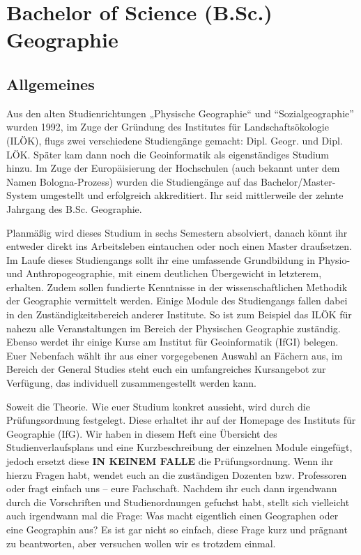 \chapter{Bachelor of Science (B.Sc.) Geographie}

\section{Allgemeines}
Aus den alten Studienrichtungen „Physische Geographie“ und "`Sozialgeographie"' wurden 1992, im Zuge der Gründung des Institutes für Landschaftsökologie (ILÖK), flugs zwei verschiedene Studiengänge gemacht: Dipl. Geogr. und Dipl. LÖK. Später kam dann noch die Geoinformatik als eigenständiges Studium hinzu. Im Zuge der Europäisierung der Hochschulen (auch bekannt unter dem Namen Bologna-Prozess) wurden die Studiengänge auf das Bachelor/Master-System umgestellt und erfolgreich akkreditiert. Ihr seid mittlerweile der zehnte Jahrgang des B.Sc. Geographie.

Planmäßig wird dieses Studium in sechs Semestern absolviert, danach könnt ihr entweder direkt ins Arbeitsleben eintauchen oder noch einen Master draufsetzen. Im Laufe dieses Studiengangs sollt ihr eine umfassende Grundbildung in Physio- und Anthropogeographie, mit einem deutlichen Übergewicht in letzterem, erhalten. Zudem sollen fundierte Kenntnisse in der wissenschaftlichen Methodik der Geographie vermittelt werden. Einige Module des Studiengangs fallen dabei in den Zuständigkeitsbereich anderer Institute. So ist zum Beispiel das ILÖK für nahezu alle Veranstaltungen im Bereich der Physischen Geographie zuständig. Ebenso werdet ihr einige Kurse am Institut für Geoinformatik (IfGI) belegen. Euer Nebenfach wählt ihr aus einer vorgegebenen Auswahl an Fächern aus, im Bereich der General Studies steht euch ein umfangreiches Kursangebot zur Verfügung, das individuell zusammengestellt werden kann.

Soweit die Theorie. Wie euer Studium konkret aussieht, wird durch die Prüfungsordnung festgelegt. Diese erhaltet ihr auf der Homepage des Instituts für Geographie (IfG). Wir haben in diesem Heft eine Übersicht des Studienverlaufsplans und eine Kurzbeschreibung der einzelnen Module eingefügt, jedoch ersetzt diese \textbf{IN KEINEM FALLE} die Prüfungsordnung. Wenn ihr hierzu Fragen habt, wendet euch an die zuständigen Dozenten bzw. Professoren oder fragt einfach uns – eure Fachschaft. Nachdem ihr euch dann irgendwann durch die Vorschriften und Studienordnungen gefuchst habt, stellt sich vielleicht auch irgendwann mal die Frage: Was macht eigentlich einen Geographen oder eine Geographin aus? Es ist gar nicht so einfach, diese Frage kurz und prägnant zu beantworten, aber versuchen wollen wir es trotzdem einmal.

